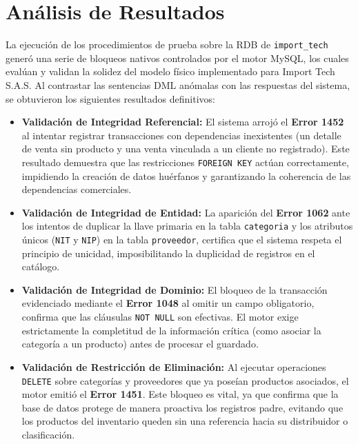 \chapter{Análisis de Resultados}

La ejecución de los procedimientos de prueba sobre la RDB de \colorbox{gray!20}{\textcolor{lineText}{\texttt{import\_tech}}} \supercite{suarez2010} generó una serie de bloqueos nativos controlados por el motor MySQL, los cuales evalúan y validan la solidez del modelo físico implementado para Import Tech S.A.S. Al contrastar las sentencias DML anómalas con las respuestas del sistema, se obtuvieron los siguientes resultados definitivos:

\begin{itemize}
    \item \textbf{Validación de Integridad Referencial:} El sistema arrojó el \textbf{Error 1452} al intentar registrar transacciones con dependencias inexistentes (un detalle de venta sin producto y una venta vinculada a un cliente no registrado). Este resultado demuestra que las restricciones \colorbox{gray!20}{\textcolor{lineText}{\texttt{FOREIGN KEY}}} actúan correctamente, impidiendo la creación de datos huérfanos y garantizando la coherencia de las dependencias comerciales.
    
    \item \textbf{Validación de Integridad de Entidad:} La aparición del \textbf{Error 1062} ante los intentos de duplicar la llave primaria en la tabla \colorbox{gray!20}{\textcolor{lineText}{\texttt{categoria}}} y los atributos únicos (\colorbox{gray!20}{\textcolor{lineText}{\texttt{NIT}}} y \colorbox{gray!20}{\textcolor{lineText}{\texttt{NIP}}}) en la tabla \colorbox{gray!20}{\textcolor{lineText}{\texttt{proveedor}}}, certifica que el sistema respeta el principio de unicidad, imposibilitando la duplicidad de registros en el catálogo.

    \item \textbf{Validación de Integridad de Dominio:} El bloqueo de la transacción evidenciado mediante el \textbf{Error 1048} al omitir un campo obligatorio, confirma que las cláusulas \colorbox{gray!20}{\textcolor{lineText}{\texttt{NOT NULL}}} son efectivas. El motor exige estrictamente la completitud de la información crítica (como asociar la categoría a un producto) antes de procesar el guardado.

    \item \textbf{Validación de Restricción de Eliminación:} Al ejecutar operaciones \colorbox{gray!20}{\textcolor{lineText}{\texttt{DELETE}}} sobre categorías y proveedores que ya poseían productos asociados, el motor emitió el \textbf{Error 1451}. Este bloqueo es vital, ya que confirma que la base de datos protege de manera proactiva los registros padre, evitando que los productos del inventario queden sin una referencia hacia su distribuidor o clasificación.
\end{itemize}
